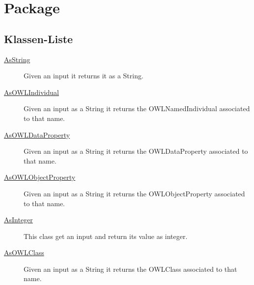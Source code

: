 
\chapter[Package ontologyFramework.OFEventManagement.OFEventParameter]{Package }\label{ontologyFramework.OFEventManagement.OFEventParameter-package}



\section{Klassen-Liste}
\begin{description}
\item[{\hyperlink{ontologyFramework.OFEventManagement.OFEventParameter.AsString-class}{AsString}}]
Given an input it returns it as a String.
\hfill\pageref{ontologyFramework.OFEventManagement.OFEventParameter.AsString-class}

\item[{\hyperlink{ontologyFramework.OFEventManagement.OFEventParameter.AsOWLIndividual-class}{AsOWLIndividual}}]
Given an input as a String it returns the OWLNamedIndividual associated to that name.
\hfill\pageref{ontologyFramework.OFEventManagement.OFEventParameter.AsOWLIndividual-class}

\item[{\hyperlink{ontologyFramework.OFEventManagement.OFEventParameter.AsOWLDataProperty-class}{AsOWLDataProperty}}]
Given an input as a String it returns the OWLDataProperty associated to that name.
\hfill\pageref{ontologyFramework.OFEventManagement.OFEventParameter.AsOWLDataProperty-class}

\item[{\hyperlink{ontologyFramework.OFEventManagement.OFEventParameter.AsOWLObjectProperty-class}{AsOWLObjectProperty}}]
Given an input as a String it returns the OWLObjectProperty associated to that name.
\hfill\pageref{ontologyFramework.OFEventManagement.OFEventParameter.AsOWLObjectProperty-class}

\item[{\hyperlink{ontologyFramework.OFEventManagement.OFEventParameter.AsInteger-class}{AsInteger}}]
This class get an input and return its value as integer.
\hfill\pageref{ontologyFramework.OFEventManagement.OFEventParameter.AsInteger-class}

\item[{\hyperlink{ontologyFramework.OFEventManagement.OFEventParameter.AsOWLClass-class}{AsOWLClass}}]
Given an input as a String it returns the OWLClass associated to that name.
\hfill\pageref{ontologyFramework.OFEventManagement.OFEventParameter.AsOWLClass-class}

\end{description}
